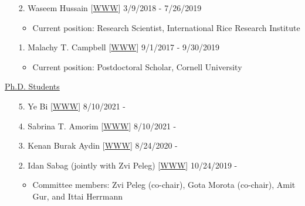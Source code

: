 \documentclass[margin,line,10pt]{res}
\begin{document}
\begin{resume}
\begin{enumerate}
  \vspace{0.3cm}
  
\item [2.] Waseem Hussain  [\textcolor{blue}{\href{https://whussain2.github.io/}{WWW}}]  \hfill 3/9/2018 - 7/26/2019
  \begin{itemize} 
  \item Current position: Research Scientist, International Rice Research Institute
  \end{itemize}
   
  \vspace{0.3cm}
  
\item [1.] Malachy T. Campbell  [\textcolor{blue}{\href{https://malachycampbell.github.io/}{WWW}}]  \hfill  9/1/2017 - 9/30/2019
  \begin{itemize} 
  \item Current position: Postdoctoral Scholar, Cornell University 
  \end{itemize}
\end{enumerate}



\begin{flushleft}
\hspace{0.2cm} \underline{Ph.D. Students}
\end{flushleft}
\begin{enumerate}


  \item [5.] Ye Bi [\textcolor{blue}{\href{https://yebi.netlify.app/}{WWW}}]  \hfill  8/10/2021 -

    \vspace{0.3cm}
    
   \item [4.] Sabrina T. Amorim [\textcolor{blue}{\href{https://sabrinaam.github.io/}{WWW}}]  \hfill  8/10/2021 -

     \vspace{0.3cm}
     
  \item [3.] Kenan Burak Aydin [\textcolor{blue}{\href{}{WWW}}]  \hfill  8/24/2020 -

    \vspace{0.3cm}

    
  \item [2.] Idan Sabag (jointly with Zvi Peleg) [\textcolor{blue}{\href{https://twitter.com/idansabag7}{WWW}}]  \hfill  10/24/2019 -

    \begin{itemize}
     \item  Committee members: Zvi Peleg (co-chair), Gota Morota (co-chair), Amit Gur, and Ittai Herrmann 
    \end{itemize}
    

\end{enumerate}
\end{resume}
\end{document}
